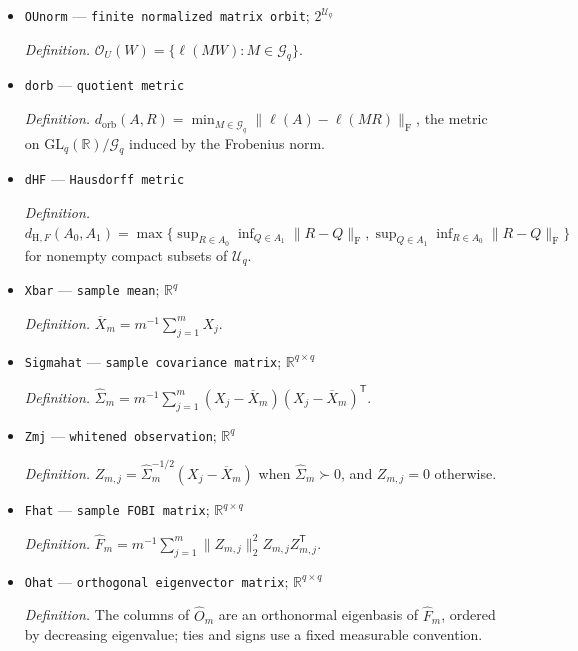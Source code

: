 \documentclass{article}
\begin{document}
\begin{itemize}
  \par\smallskip\noindent\emph{Definition.} \(\mathcal G_q=(\mathbb R^{\times})^q\rtimes\mathfrak S_q\) acts on nonsingular matrices by \((a,\pi)\cdot A=\operatorname{diag}(a_1,\ldots,a_q)P_\pi A\).
  \item \texttt{OUnorm} --- \texttt{finite normalized matrix orbit}; \(2^{\mathcal U_q}\)
  \par\smallskip\noindent\emph{Definition.} \(\mathcal O_U(W)=\{\ell(MW):M\in\mathcal G_q\}\).
  \item \texttt{dorb} --- \texttt{quotient metric}
  \par\smallskip\noindent\emph{Definition.} \(d_{\mathrm{orb}}(A,R)=\min_{M\in\mathcal G_q}\|\ell(A)-\ell(MR)\|_{\mathrm F}\), the metric on \(\mathrm{GL}_q(\mathbb R)/\mathcal G_q\) induced by the Frobenius norm.
  \item \texttt{dHF} --- \texttt{Hausdorff metric}
  \par\smallskip\noindent\emph{Definition.} \(d_{\mathrm H,F}(A_0,A_1)=\max\{\sup_{R\in A_0}\inf_{Q\in A_1}\|R-Q\|_{\mathrm F},\sup_{Q\in A_1}\inf_{R\in A_0}\|R-Q\|_{\mathrm F}\}\) for nonempty compact subsets of \(\mathcal U_q\).
  \item \texttt{Xbar} --- \texttt{sample mean}; \(\mathbb R^q\)
  \par\smallskip\noindent\emph{Definition.} \(\overline X_m=m^{-1}\sum_{j=1}^mX_j\).
  \item \texttt{Sigmahat} --- \texttt{sample covariance matrix}; \(\mathbb R^{q\times q}\)
  \par\smallskip\noindent\emph{Definition.} \(\widehat\Sigma_m=m^{-1}\sum_{j=1}^m(X_j-\overline X_m)(X_j-\overline X_m)^{\mathsf T}\).
  \item \texttt{Zmj} --- \texttt{whitened observation}; \(\mathbb R^q\)
  \par\smallskip\noindent\emph{Definition.} \(Z_{m,j}=\widehat\Sigma_m^{-1/2}(X_j-\overline X_m)\) when \(\widehat\Sigma_m\succ0\), and \(Z_{m,j}=0\) otherwise.
  \item \texttt{Fhat} --- \texttt{sample FOBI matrix}; \(\mathbb R^{q\times q}\)
  \par\smallskip\noindent\emph{Definition.} \(\widehat F_m=m^{-1}\sum_{j=1}^m\|Z_{m,j}\|_2^2Z_{m,j}Z_{m,j}^{\mathsf T}\).
  \item \texttt{Ohat} --- \texttt{orthogonal eigenvector matrix}; \(\mathbb R^{q\times q}\)
  \par\smallskip\noindent\emph{Definition.} The columns of \(\widehat O_m\) are an orthonormal eigenbasis of \(\widehat F_m\), ordered by decreasing eigenvalue; ties and signs use a fixed measurable convention.

\end{itemize}
\end{document}
